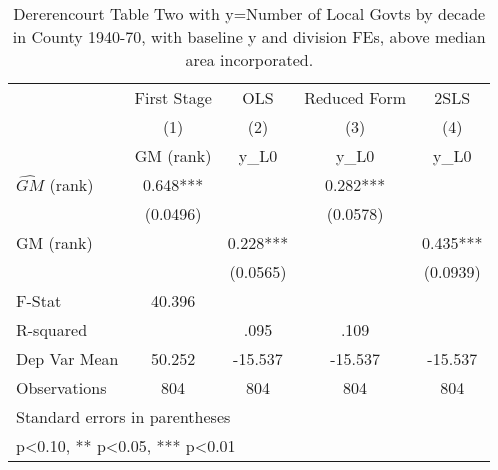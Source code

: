 \begin{table}[htbp]\centering
\def\sym#1{\ifmmode^{#1}\else\(^{#1}\)\fi}
\caption{Dererencourt Table Two with y=Number of Local Govts by decade in County 1940-70, with baseline y and division FEs, above median area incorporated.}
\begin{tabular}{l*{4}{c}}
\toprule
                    & First Stage   &         OLS   &Reduced Form   &        2SLS   \\
                    &\multicolumn{1}{c}{(1)}&\multicolumn{1}{c}{(2)}&\multicolumn{1}{c}{(3)}&\multicolumn{1}{c}{(4)}\\
                    &\multicolumn{1}{c}{GM  (rank)}&\multicolumn{1}{c}{y\_L0}&\multicolumn{1}{c}{y\_L0}&\multicolumn{1}{c}{y\_L0}\\
\midrule
$\hat{GM}$ (rank)   &       0.648***&               &       0.282***&               \\
                    &    (0.0496)   &               &    (0.0578)   &               \\
\addlinespace
GM  (rank)          &               &       0.228***&               &       0.435***\\
                    &               &    (0.0565)   &               &    (0.0939)   \\
\midrule
F-Stat              &      40.396   &               &               &               \\
R-squared           &               &        .095   &        .109   &               \\
Dep Var Mean        &      50.252   &     -15.537   &     -15.537   &     -15.537   \\
Observations        &         804   &         804   &         804   &         804   \\
\bottomrule
\multicolumn{5}{l}{\footnotesize Standard errors in parentheses}\\
\multicolumn{5}{l}{\footnotesize * p<0.10, ** p<0.05, *** p<0.01}\\
\end{tabular}
\end{table}
